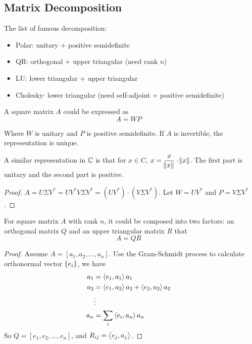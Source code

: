 \subsection{Matrix Decomposition}

The list of famous decomposition:
\begin{itemize}
    \item Polar: unitary + positive semidefinite
    \item QR: orthogonal + upper triangular (need rank $n$)
    \item LU: lower triangular + upper triangular
    \item Cholesky: lower triangular (need self-adjoint + positive semidefinite)
\end{itemize}

\begin{theorem}
    A square matrix $A$ could be expressed as 
    \begin{equation}
        A = WP
    \end{equation}
    
    Where $W$ is unitary and $P$ is positive semidefinite. If $A$ is invertible, the representation is unique. 
    
    A similar representation in $\mathbb{C}$ is that for $x \in C$, $\displaystyle x = \frac{x}{\norm{x}} \cdot \norm{x}$. The first part is unitary and the second part is positive.
\end{theorem}
\begin{proof}
    $A = U\Sigma V^* = U V^* V \Sigma V^* = (U V^*) \cdot (V \Sigma V^*)$. Let $W = U V^*$ and $P = V \Sigma V^*$.
\end{proof}


\begin{theorem}[QR Decomposition]
    For square matrix $A$ with rank $n$, it could be composed into two factors: an orthogonal matrix $Q$ and an upper triangular matrix $R$ that 
    \begin{equation}
        A = QR
    \end{equation}
\end{theorem}
\begin{proof}
    Assume $A=[a_1, a_2, ..., a_n]$. Use the Gram-Schmidt process to calculate orthonormal vector $\set{e_i}$, we have
    \begin{equation*}
        \begin{aligned}
            a_1 &= \left\langle \displaystyle e_1, a_1 \right\rangle a_1 \\
            a_2 &= \left\langle \displaystyle e_1, a_2 \right\rangle a_2 + \left\langle \displaystyle e_2, a_2 \right\rangle a_2\\
            &\vdots \\
            a_n &= \sum_i \left\langle \displaystyle e_i, a_n \right\rangle a_n
        \end{aligned}
    \end{equation*}
    So $Q=[e_1, e_2, ..., e_n]$, and $R_{ij} = \left\langle \displaystyle e_j, a_j \right\rangle$.
\end{proof}


